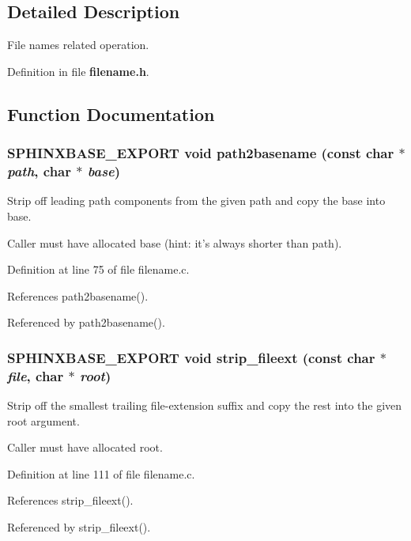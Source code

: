 \subsection{Detailed Description}
File names related operation. 



Definition in file {\bf filename.h}.

\subsection{Function Documentation}
\subsubsection[{path2basename}]{\setlength{\rightskip}{0pt plus 5cm}SPHINXBASE\_\-EXPORT void path2basename (const char $\ast$ {\em path}, \/  char $\ast$ {\em base})}\label{filename_8h_d8a88d52ec0af498bc126a90871b2efe}


Strip off leading path components from the given path and copy the base into base. 

Caller must have allocated base (hint: it's always shorter than path). 

Definition at line 75 of file filename.c.

References path2basename().

Referenced by path2basename().
\subsubsection[{strip\_\-fileext}]{\setlength{\rightskip}{0pt plus 5cm}SPHINXBASE\_\-EXPORT void strip\_\-fileext (const char $\ast$ {\em file}, \/  char $\ast$ {\em root})}\label{filename_8h_d40b54252813d276ff2ebb097b242657}


Strip off the smallest trailing file-extension suffix and copy the rest into the given root argument. 

Caller must have allocated root. 

Definition at line 111 of file filename.c.

References strip\_\-fileext().

Referenced by strip\_\-fileext().